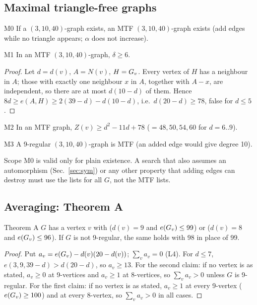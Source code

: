 \subsection{Maximal triangle-free graphs}\label{sec:mtf}
\begin{namedthm}{M0}
If a $(3,10,40)$-graph exists, an MTF $(3,10,40)$-graph exists (add edges while no triangle appears;
$\alpha$ does not increase).
\end{namedthm}

\begin{namedthm}{M1}
In an MTF $(3,10,40)$-graph, $\delta \ge 6$.
\end{namedthm}
\begin{proof}
Let $d = d(v)$, $A = N(v)$, $H = G_{v}$. Every vertex of $H$ has a
neighbour in $A$; those with exactly one neighbour $x$ in $A$, together with $A - x$, are independent, so there are at most
$d(10 - d)$ of them. Hence $8d \ge e(A,H) \ge 2(39 - d) - d(10 - d)$, i.e.\ $d(20 - d) \ge 78$, false for $d \le 5$.
\end{proof}

\begin{namedthm}{M2}
In an MTF graph, $Z(v) \ge d^2 - 11d + 78$ ($= 48, 50, 54, 60$ for $d = 6..9$).
\end{namedthm}

\begin{namedthm}{M3}
A 9-regular $(3,10,40)$-graph is MTF (an added edge would give degree 10).
\end{namedthm}

\begin{nameddef}{Scope}
M0 is valid only for plain existence. A search that also assumes an automorphism (Sec.~\ref{sec:sym}) or any
other property that adding edges can destroy must use the lists for all $G$, not the MTF lists.
\end{nameddef}

\subsection{Averaging: Theorem A}\label{sec:thmA}
\begin{namedthm}{Theorem A}
$G$ has a vertex $v$ with ($d(v) = 9$ and $e(G_{v}) \le 99$) or ($d(v) = 8$ and $e(G_{v}) \le 96$). If $G$ is not
9-regular, the same holds with 98 in place of 99.
\end{namedthm}
\begin{proof}
Put $a_v = e(G_{v}) - d(v)(20 - d(v))$; $\sum_v a_v = 0$ (L4). For $d \le 7$, $e(3,9,39-d) > d(20-d)$, so $a_v \ge 13$.
For the second claim: if no vertex is as stated, $a_v \ge 0$ at 9-vertices and $a_v \ge 1$ at 8-vertices, so
$\sum_v a_v > 0$ unless $G$ is 9-regular. For the first claim: if no vertex is as stated, $a_v \ge 1$ at every 9-vertex
($e(G_{v}) \ge 100$) and at every 8-vertex, so $\sum_v a_v > 0$ in all cases.
\end{proof}

